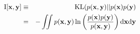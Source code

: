 \begin{eqnarray*}
{\rm I}[{\bf x},{\bf y}] &\equiv& {\rm KL}(p({\bf x},{\bf y}) ||  p({\bf x})p({\bf y}) \\
&=& - \iint p({\bf x},{\bf y})\ln \left( \frac{p({\bf x})p({\bf y})}{p({\bf x},{\bf y})}\right){\rm d}{\bf x}{\rm d}{\bf y}
\end{eqnarray*}
